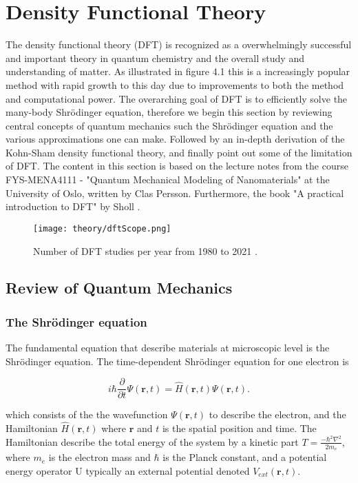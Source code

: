 \chapter{Density Functional Theory}
\label{sec:DFT}

The density functional theory (DFT) is recognized as a overwhelmingly successful and important theory in quantum chemistry and the overall study and understanding of matter. As illustrated in figure 4.1 this is a increasingly popular method with rapid growth to this day due to improvements to both the method and computational power. The overarching goal of DFT is to efficiently solve the many-body Shr\"{o}dinger equation, therefore we begin this section by reviewing central concepts of quantum mechanics such the Shr\"{o}dinger equation and the various approximations one can make. Followed by an in-depth derivation of the Kohn-Sham density functional theory, and finally point out some of the limitation of DFT. The content in this section is based on the lecture notes \cite{persson2020} from the course FYS-MENA4111 - "Quantum Mechanical Modeling of Nanomaterials" at the University of Oslo, written by Clas Persson. Furthermore, the book "A practical introduction to DFT" by Sholl \cite{Sholl2009}. 

\begin{figure}[H]
\texttt{[image: theory/dftScope.png]}
\caption{Number of DFT studies per year from 1980 to 2021 \cite{dimensions}.}
\end{figure}

\section{Review of Quantum Mechanics}

\subsection{The Shr\"{o}dinger equation}
The fundamental equation that describe materials at microscopic level is the Shr\"{o}dinger equation. The time-dependent Shr\"{o}dinger equation for one electron is

\begin{equation}
    i\hbar\frac{\partial}{\partial t}\Psi(\boldsymbol{r}, t) = \hat{H}(\boldsymbol{r},t)\Psi(\boldsymbol{r}, t).
\end{equation}

which consists of the the wavefunction $\Psi(\boldsymbol{r},t)$ to describe the electron, and the Hamiltonian $\hat{H}(\boldsymbol{r},t)$ where $\boldsymbol{r}$ and $t$ is the spatial position and time. The Hamiltonian describe the total energy of the system by a kinetic part $T = \frac{-\hbar^2\nabla^2}{2m_e}$, where $m_e$ is the electron mass and $\hbar$ is the Planck constant, and a potential energy operator U typically an external potential denoted $V_{ext}(\boldsymbol{r}, t)$. 

